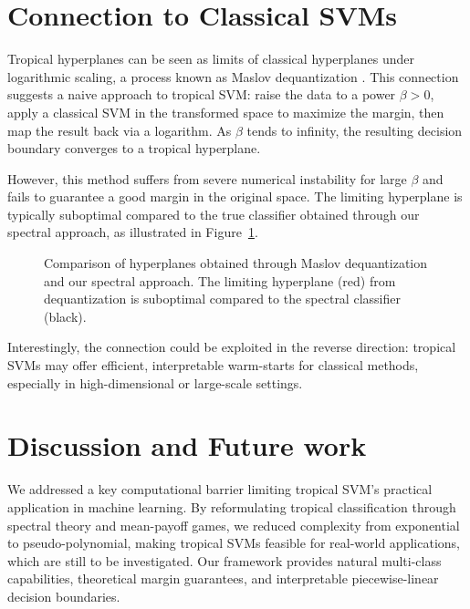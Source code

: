 \documentclass{article}
\begin{document}
\newpage
\section{Connection to Classical SVMs}\label{sec:maslov}
Tropical hyperplanes can be seen as limits of classical hyperplanes under logarithmic scaling, a process known as Maslov dequantization \cite{viro2001}. This connection suggests a naive approach to tropical SVM: raise the data to a power $\beta > 0$, apply a classical SVM in the transformed space to maximize the margin, then map the result back via a logarithm. As $\beta$ tends to infinity, the resulting decision boundary converges to a tropical hyperplane.

However, this method suffers from severe numerical instability for large $\beta$ and fails to guarantee a good margin in the original space. The limiting hyperplane is typically suboptimal compared to the true classifier obtained through our spectral approach, as illustrated in Figure~\ref{fig:maslov_dequantization}.

\begin{figure}[h]
    \centering
    \resizebox{0.5\textwidth}{!}{\clipbox{0.15\width{} 0.15\height{} 0.15\width{} 0.15\height{}}{}}
    \caption{Comparison of hyperplanes obtained through Maslov dequantization and our spectral approach. The limiting hyperplane (red) from dequantization is suboptimal compared to the spectral classifier (black).}
    \label{fig:maslov_dequantization}
\end{figure}

Interestingly, the connection could be exploited in the reverse direction: tropical SVMs may offer efficient, interpretable warm-starts for classical methods, especially in high-dimensional or large-scale settings.

\section{Discussion and Future work}\label{sec:discussion}

We addressed a key computational barrier limiting tropical SVM's practical application in machine learning. By reformulating tropical classification through spectral theory and mean-payoff games, we reduced complexity from exponential to pseudo-polynomial, making tropical SVMs feasible for real-world applications, which are still to be investigated. Our framework provides natural multi-class capabilities, theoretical margin guarantees, and interpretable piecewise-linear decision boundaries.
\end{document}
